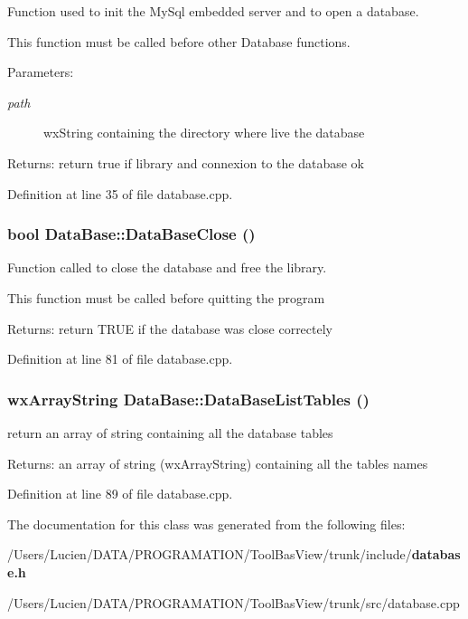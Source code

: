 Function used to init the My\-Sql embedded server and to open a database. 

This function must be called before other Database functions. \begin{Desc}
\item[Parameters:]
\begin{description}
\item[{\em path}]wx\-String containing the directory where live the database \end{description}
\end{Desc}
\begin{Desc}
\item[Returns:]return true if library and connexion to the database ok \end{Desc}


Definition at line 35 of file database.cpp.
\subsubsection{\setlength{\rightskip}{0pt plus 5cm}bool Data\-Base::Data\-Base\-Close ()}\label{class_data_base_102228775263b0936f914f0454933d9e}


Function called to close the database and free the library. 

This function must be called before quitting the program \begin{Desc}
\item[Returns:]return TRUE if the database was close correctely \end{Desc}


Definition at line 81 of file database.cpp.
\subsubsection{\setlength{\rightskip}{0pt plus 5cm}wx\-Array\-String Data\-Base::Data\-Base\-List\-Tables ()}\label{class_data_base_48f6ee62c3eecd5af867b98f2ff13426}


return an array of string containing all the database tables \begin{Desc}
\item[Returns:]an array of string (wx\-Array\-String) containing all the tables names \end{Desc}




Definition at line 89 of file database.cpp.

The documentation for this class was generated from the following files:\begin{CompactItemize}
\item 
/Users/Lucien/DATA/PROGRAMATION/Tool\-Bas\-View/trunk/include/{\bf database.h}\item 
/Users/Lucien/DATA/PROGRAMATION/Tool\-Bas\-View/trunk/src/database.cpp\end{CompactItemize}
